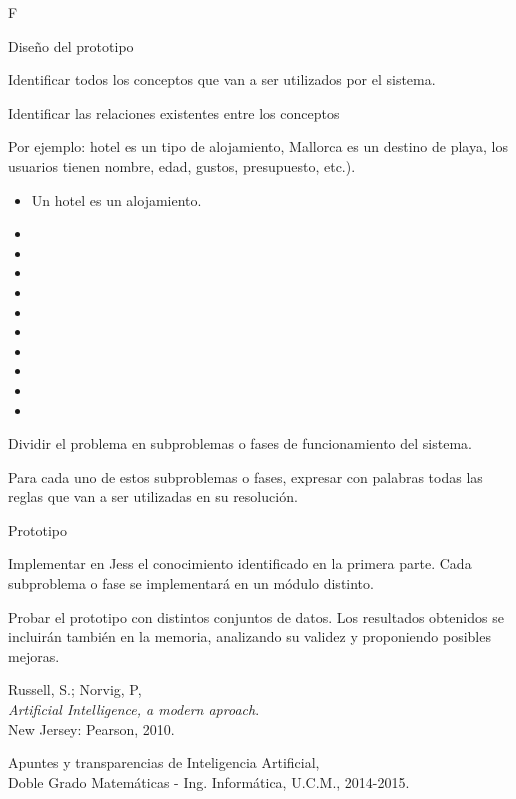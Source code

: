 F\documentclass[11pt, a4paper, spanish, openright, twoside]{book}
\begin{document}
\begin{section}{Diseño del prototipo}
\begin{subsection}{Identificar todos los conceptos que van a ser utilizados por el sistema.}
	\end{subsection}

	\begin{subsection}{Identificar las relaciones existentes entre los conceptos}
	
	Por ejemplo: hotel es un tipo de alojamiento, Mallorca es un destino de playa,
	 los usuarios tienen nombre, edad, gustos, presupuesto, etc.).

		\begin{itemize}
			\item Un hotel es un alojamiento.
			\item 
			\item 
			\item 
			\item 
			\item 
			\item 
			\item 
			\item 
			\item 

			\item 

			
		\end{itemize}
	\end{subsection}

	\begin{subsection}{Dividir el problema en subproblemas o fases de funcionamiento del sistema.}
		
	 Para cada uno de estos subproblemas o fases, expresar con palabras todas las reglas que 
	van a ser utilizadas en su resolución.

	\end{subsection}


	
\end{section}
	\newpage
	\begin{section}{Prototipo}

		Implementar en Jess el conocimiento identificado en la primera parte. Cada subproblema o
		fase se implementará en un módulo distinto.


		Probar el prototipo con distintos conjuntos de datos. Los resultados obtenidos se incluirán
		también en la memoria, analizando su validez y proponiendo posibles mejoras.

	\end{section}

	
\begin{thebibliography}{9}

	Russell, S.; Norvig, P, \\
	\emph{Artificial Intelligence, a modern aproach}.\\
	New Jersey: Pearson, 2010.
	
	Apuntes y transparencias de Inteligencia Artificial, \\
	Doble Grado Matemáticas - Ing. Informática, U.C.M., 2014-2015.

\end{thebibliography}
\end{document}
